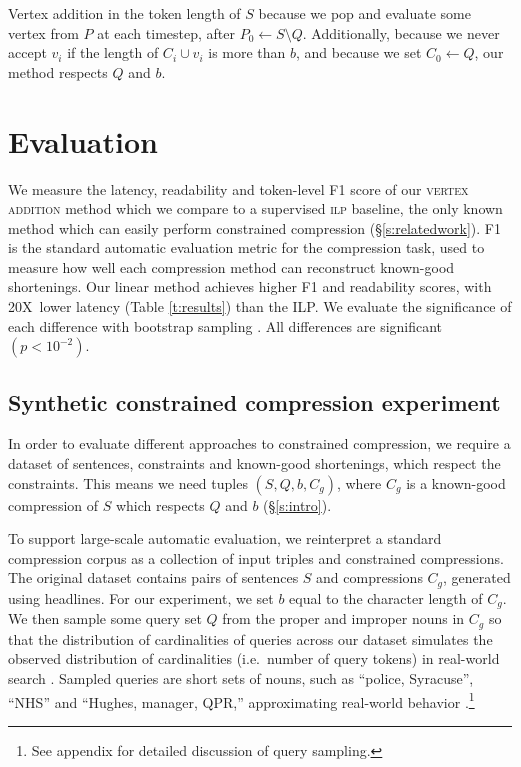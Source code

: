 \documentclass[11pt,a4paper]{article}
\newcommand{\speedup}[0]{20X~}
\begin{document}
Vertex addition in the token length of $S$ because we pop and evaluate some vertex from $P$ at each timestep, after $P_0  \gets S \setminus Q$. Additionally, because we never accept $v_i$ if the length of $C_i \cup v_i$ is more than $b$, and because we set $C_0 \gets Q$, our method respects $Q$ and $b$.

\section{Evaluation}\label{s:autoeval}

We measure the latency, readability and token-level F1 score of our \textsc{vertex addition} method which we compare to a supervised \textsc{ilp} baseline, the only known method which can easily perform constrained compression (\S\ref{s:relatedwork}). F1 is the standard automatic evaluation metric for the compression task, used to measure how well each compression method can reconstruct known-good shortenings. Our linear method achieves higher F1 and readability scores, with \speedup lower latency (Table \ref{t:results}) than the ILP. We evaluate the significance of each difference with bootstrap sampling \cite{D12-1091}. All differences are significant {\small $(p < 10^{-2})$}. 

\subsection{Synthetic constrained compression experiment}\label{s:constrained}

In order to evaluate different approaches to constrained compression, we require a dataset of sentences, constraints and known-good shortenings, which respect the constraints. This means we need tuples $(S, Q, b, C_g)$, where $C_g$ is a known-good compression of $S$ which respects $Q$ and $b$ (\S\ref{s:intro}).

To support large-scale automatic evaluation, we reinterpret a standard compression corpus \cite{filippova2013overcoming}
as a collection of input triples and constrained compressions. The original dataset contains pairs of sentences $S$ and compressions $C_g$, generated using headlines. For our experiment, we set $b$ equal to  the character length of $C_g$. We then sample some query set $Q$ from the proper and improper nouns in $C_g$ so that the distribution of cardinalities of queries across our dataset simulates the observed distribution of cardinalities (i.e.\ number of query tokens) in real-world search \cite{Jansen2000RealLR}. Sampled queries are short sets of nouns, such as ``police, Syracuse'', ``NHS'' and ``Hughes, manager, QPR,'' approximating real-world behavior \cite{Barr2008TheLS}.\footnote{See appendix for detailed discussion of query sampling.} 
\end{document}
